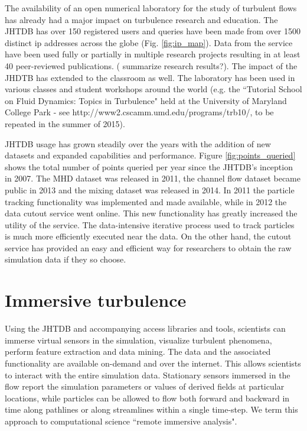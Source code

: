 \documentclass[10pt,twocolumn]{article}
\begin{document}
The availability of an open numerical laboratory for the study of turbulent flows has already had a major impact on turbulence research and education. 
The JHTDB has over 150 registered users and queries have been made from over 1500 distinct ip addresses across the globe (Fig. \ref{fig:ip_map}).
Data from the service have been used fully or partially in multiple research projects resulting in at least 40 peer-reviewed publications. ({\color{red} summarize
research results?}). The impact of the JHDTB has extended to the classroom as well. The laboratory has been used in various classes and student workshops 
around the world (e.g. the ``Tutorial School on Fluid Dynamics: Topics in Turbulence" held at the University of Maryland College Park - 
see http://www2.cscamm.umd.edu/programs/trb10/, to be repeated in the summer of 2015).

JHTDB usage has grown steadily over the years with the addition of new datasets and expanded capabilities and performance. Figure \ref{fig:points_queried}
shows the total number of points queried per year since the JHTDB's inception in 2007. The MHD dataset was released in 2011, the channel flow dataset
became public in 2013 and the mixing dataset was released in 2014. In 2011 the particle tracking functionality was implemented and made available, while
in 2012 the data cutout service went online. This new functionality has greatly increased the utility of the service. The data-intensive iterative process used to
track particles is much more efficiently executed near the data. On the other hand, the cutout service has provided an easy and efficient way for researchers to
obtain the raw simulation data if they so choose. 

\section{Immersive turbulence}
Using the JHTDB and accompanying access libraries and tools, scientists can immerse virtual sensors in the simulation, visualize turbulent phenomena, 
perform feature extraction and data mining. The data and the associated functionality are available on-demand and over the internet. This allows scientists 
to interact with the entire simulation data. Stationary sensors immersed in the flow report the simulation parameters or values of derived fields at particular 
locations, while particles can be allowed to flow both forward and backward in time along pathlines or along streamlines within a single time-step. 
We term this approach to computational science ``remote immersive analysis".
\end{document}
